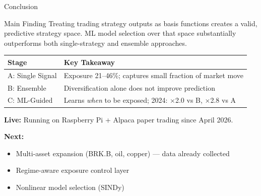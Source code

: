 \documentclass[aspectratio=169]{beamer}
\begin{document}
\begin{frame}{Conclusion}
  \begin{block}{Main Finding}
    Treating trading strategy outputs as basis functions creates a valid,
    predictive strategy space. ML model selection over that space substantially
    outperforms both single-strategy and ensemble approaches.
  \end{block}

  \vspace{0.5em}
  \begin{tabular}{ll}
    \toprule
    Stage & Key Takeaway \\
    \midrule
    A: Single Signal  & Exposure 21--46\%; captures small fraction of market move \\
    B: Ensemble       & Diversification alone does not improve prediction \\
    C: ML-Guided      & Learns \emph{when} to be exposed; 2024: $\times$2.0 vs B, $\times$2.8 vs A \\
    \bottomrule
  \end{tabular}

  \vspace{0.5em}
  \textbf{Live:} Running on Raspberry Pi + Alpaca paper trading since April 2026.

  \vspace{0.3em}
  \textbf{Next:}
  \begin{itemize}
    \item Multi-asset expansion (BRK.B, oil, copper) — data already collected
    \item Regime-aware exposure control layer
    \item Nonlinear model selection (SINDy)
  \end{itemize}
\end{frame}
\end{document}
